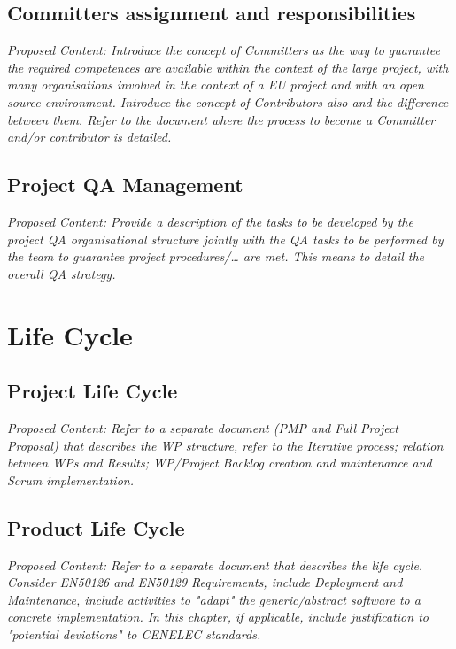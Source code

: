 \documentclass{template/openetcs_article}
\begin{document}


\subsection{Committers assignment and responsibilities}
\textit{Proposed  Content: Introduce the concept of Committers as the way to guarantee the required competences are available within the context of the large project, with many organisations involved in the context of a EU project and with an open source environment.  Introduce the concept of Contributors also and the difference between them. Refer to the document where the process to become a Committer and/or contributor is detailed.}

\subsection{Project QA Management}
\textit{Proposed Content: Provide a description of the tasks to be developed by the project  QA organisational structure jointly with the QA tasks to be performed by the team to guarantee project procedures/{\dots} are met. This means to detail the overall QA strategy.}

\section{Life Cycle}

\subsection{Project Life Cycle }
\textit{Proposed Content: Refer to a separate document (PMP and Full Project Proposal)  that describes the WP structure, refer to  the Iterative process; relation between WPs and Results; WP/Project Backlog creation and maintenance and Scrum implementation.}


\subsection{Product Life Cycle }
\textit{Proposed Content: Refer to a separate document that describes the life cycle. Consider EN50126 and EN50129 Requirements, include Deployment and Maintenance, include activities to "adapt" the generic/abstract software to a concrete implementation.
In this chapter, if applicable, include justification to "potential deviations" to CENELEC standards.}
\end{document}
